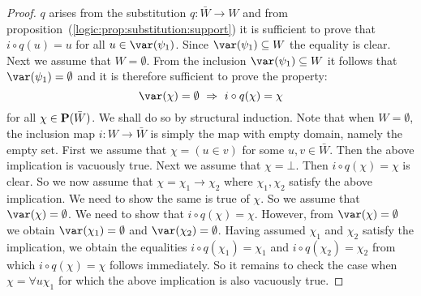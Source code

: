 \begin{proof}
$q$ arises from the substitution $q:\bar{W}\to W$ and from
proposition~(\ref{logic:prop:substitution:support}) it is sufficient
to prove that $i\circ q(u)=u$ for all $u\in\var(\psi_{1})$. Since
$\var(\psi_{1})\subseteq W$ the equality is clear. Next we assume
that $W=\emptyset$. From the inclusion $\var(\psi_{1})\subseteq W$
it follows that $\var(\psi_{1})=\emptyset$ and it is therefore
sufficient to prove the property:
    \[
    \var(\chi)=\emptyset\ \Rightarrow\ i\circ q(\chi)=\chi
    \]
for all $\chi\in{\bf P}(\bar{W})$. We shall do so by structural
induction. Note that when $W=\emptyset$, the inclusion map
$i:W\to\bar{W}$ is simply the map with empty domain, namely the
empty set. First we assume that $\chi=(u\in v)$ for some
$u,v\in\bar{W}$. Then the above implication is vacuously true. Next
we assume that $\chi=\bot$. Then $i\circ q(\chi)=\chi$ is clear. So
we now assume that $\chi=\chi_{1}\to\chi_{2}$ where
$\chi_{1},\chi_{2}$ satisfy the above implication. We need to show
the same is true of $\chi$. So we assume that
$\var(\chi)=\emptyset$. We need to show that $i\circ q(\chi)=\chi$.
However, from $\var(\chi)=\emptyset$ we obtain
$\var(\chi_{1})=\emptyset$ and $\var(\chi_{2})=\emptyset$. Having
assumed $\chi_{1}$ and $\chi_{2}$ satisfy the implication, we obtain
the equalities $i\circ q(\chi_{1})=\chi_{1}$ and $i\circ
q(\chi_{2})=\chi_{2}$ from which $i\circ q(\chi)=\chi$ follows
immediately. So it remains to check the case when $\chi=\forall
u\chi_{1}$ for which the above implication is also vacuously true.
\end{proof}

